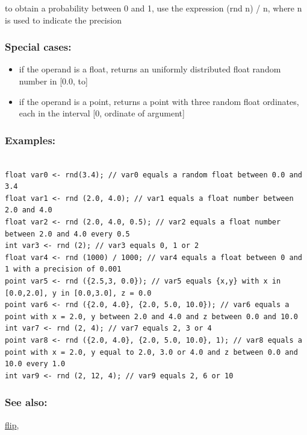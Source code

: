 \documentclass[]{book}
\providecommand{\tightlist}{%
  \setlength{\itemsep}{0pt}\setlength{\parskip}{0pt}}
\theoremstyle{definition}
\theoremstyle{definition}
\theoremstyle{definition}
\theoremstyle{remark}
\begin{document}
to obtain a probability between 0 and 1, use the expression (rnd n) / n,
where n is used to indicate the precision

\subsubsection{Special cases:}\label{special-cases-119}

\begin{itemize}
\tightlist
\item
  if the operand is a float, returns an uniformly distributed float
  random number in {[}0.0, to{]}\\
\item
  if the operand is a point, returns a point with three random float
  ordinates, each in the interval {[}0, ordinate of argument{]}
\end{itemize}

\subsubsection{Examples:}\label{examples-302}

\begin{verbatim}
 
float var0 <- rnd(3.4); // var0 equals a random float between 0.0 and 3.4 
float var1 <- rnd (2.0, 4.0); // var1 equals a float number between 2.0 and 4.0 
float var2 <- rnd (2.0, 4.0, 0.5); // var2 equals a float number between 2.0 and 4.0 every 0.5 
int var3 <- rnd (2); // var3 equals 0, 1 or 2 
float var4 <- rnd (1000) / 1000; // var4 equals a float between 0 and 1 with a precision of 0.001 
point var5 <- rnd ({2.5,3, 0.0}); // var5 equals {x,y} with x in [0.0,2.0], y in [0.0,3.0], z = 0.0 
point var6 <- rnd ({2.0, 4.0}, {2.0, 5.0, 10.0}); // var6 equals a point with x = 2.0, y between 2.0 and 4.0 and z between 0.0 and 10.0 
int var7 <- rnd (2, 4); // var7 equals 2, 3 or 4 
point var8 <- rnd ({2.0, 4.0}, {2.0, 5.0, 10.0}, 1); // var8 equals a point with x = 2.0, y equal to 2.0, 3.0 or 4.0 and z between 0.0 and 10.0 every 1.0 
int var9 <- rnd (2, 12, 4); // var9 equals 2, 6 or 10
\end{verbatim}

\subsubsection{See also:}\label{see-also-176}

\href{operators-d-to-h.html\#flip}{flip},
\end{document}
